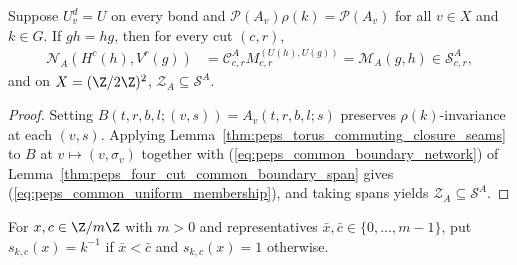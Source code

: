 \begin{lemma}%
    \label{thm:peps_four_cut_common_uniform_membership}
    \leanok
    Suppose $U^d_v=U$ on every bond and $\mathcal P(A_v)\rho(k)=\mathcal P(A_v)$
    for all $v\in X$ and $k\in G$. If $gh=hg$, then for every cut $(c,r)$,
    \begin{align}
        \mathcal N_A(H^c(h),V^r(g))
         & =\mathcal C^A_{c,r}M^{(U(h),U(g))}_{c,r}
        =\mathcal M_A(g,h)\in\mathcal S^A_{c,r},
        \label{eq:peps_common_uniform_membership}
    \end{align}
    and on $X=(\Z/2\Z)^2$, $\mathcal Z_A\subseteq\mathcal S^A$.
\end{lemma}
\begin{proof}\leanok
    Setting $B(t,r,b,l;(v,s))=A_v(t,r,b,l;s)$ preserves $\rho(k)$-invariance at
    each $(v,s)$. Applying Lemma~\ref{thm:peps_torus_commuting_closure_seams}
    to $B$ at $v\mapsto(v,\sigma_v)$ together with
    (\ref{eq:peps_common_boundary_network}) of
    Lemma~\ref{thm:peps_four_cut_common_boundary_span} gives
    (\ref{eq:peps_common_uniform_membership}), and taking spans yields
    $\mathcal Z_A\subseteq\mathcal S^A$.
\end{proof}

\begin{definition}%
    \label{def:peps_four_cut_common_seam_gauge}
    \leanok
    For $x,c\in\Z/m\Z$ with $m>0$ and representatives
    $\bar x,\bar c\in\{0,\ldots,m-1\}$, put $s_{k,c}(x)=k^{-1}$ if
    $\bar x<\bar c$ and $s_{k,c}(x)=1$ otherwise.
\end{definition}

